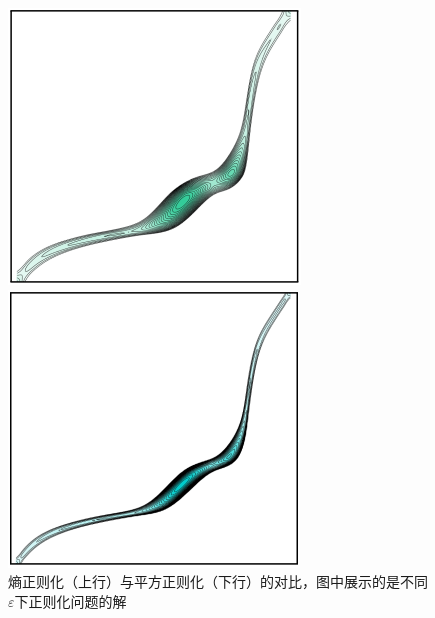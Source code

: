 \documentclass[cn,10pt,math=newtx,citestyle=gb7714-2015,bibstyle=gb7714-2015]{elegantbook}
\begin{document}
\begin{figure}[H]
\begin{minipage}{0.8\linewidth}
\begin{minipage}{0.19\linewidth}
		\caption*{$\varepsilon=10^2$}
	\end{minipage}
	\begin{minipage}{0.19\linewidth}
		\centering
		    \includegraphics[width=\linewidth]{figure/fig4.6/9.png}
		\caption*{$\varepsilon=10$}
	\end{minipage}
	\begin{minipage}{0.19\linewidth}
		\centering
		    \includegraphics[width=\linewidth]{figure/fig4.6/10.png}
		\caption*{$\varepsilon=1$}
	\end{minipage}
	\end{minipage}
	\vspace{.5em}
	\caption{熵正则化（上行）与平方正则化（下行）的对比，图中展示的是不同$\varepsilon$下正则化问题的解}
	\label{图4.6}
\end{figure}
\end{document}
